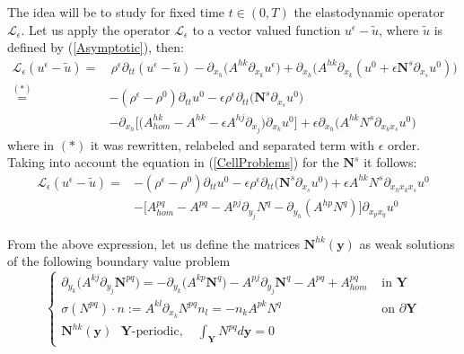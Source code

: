 The idea will be to study for fixed time $t \in (0,T)$ the elastodynamic operator $\mathcal{L}_{\epsilon}$.
Let us apply the operator $\mathcal{L}_{\epsilon}$ to a vector valued function $u^{\epsilon}-\tilde{u}$, where $\tilde{u}$ is defined by (\ref{Asymptotic}), then:
\begin{align*}
    \mathcal{L}_{\epsilon} (u^{\epsilon}-\tilde{u}) =&\, \rho^{\epsilon} \partial_{tt} (u^{\epsilon}-\tilde{u}) - \partial_{x_h} \big( A^{hk}\partial_{x_k} u^{\epsilon} \big) + \partial_{x_h} \big( A^{hk}\partial_{x_k} (u^0 + \epsilon \mathbf{N}^s \partial_{x_s}u^0 )\big) \\
    \overset{(*)}{=}& - (\rho^{\epsilon}-\rho^0) \partial_{tt} u^0 - \epsilon \rho^{\epsilon} \partial_{tt}\big(\mathbf{N}^s \partial_{x_s}u^0 \big)  \\
    & - \partial_{x_h} \big[ \big( A_{hom}^{hk} - A^{hk} - \epsilon A^{hj}\partial_{x_j}\big) \partial_{x_k} u^0 \big] + \epsilon \partial_{x_h} \big( A^{hk} N^s \partial_{x_k x_s} u^0 \big) 
\end{align*}
where in $(*)$ it was rewritten, relabeled and separated term with $\epsilon$ order.
Taking into account the equation in (\ref{CellProblems}) for the $\mathbf{N}^s$ it follows:
\begin{align*}
    \mathcal{L}_{\epsilon} (u^{\epsilon} - \tilde{u})  =& - (\rho^{\epsilon}-\rho^0) \partial_{tt} u^0 - \epsilon \rho^{\epsilon} \partial_{tt}\big(\mathbf{N}^s \partial_{x_s}u^0 \big) + \epsilon A^{hk}N^s \partial_{x_h x_k x_s}u^0 \\
    & - \big[ A^{pq}_{hom} - A^{pq} - A^{pj} \partial_{y_j} N^q - \partial_{y_h}(A^{hp} N^q) \big] \partial_{x_p x_q} u^0 
    \end{align*}

From the above expression, let us define the matrices $\mathbf{N}^{hk}(\mathbf{y})$ as weak solutions of the following boundary value problem
\begin{equation}
    \label{SecondCellProblem}
    \left \{
    \begin{array}{cc}
        \partial_{y_k} \big( A^{kj}\partial_{y_j} \mathbf{N}^{pq}\big) = -\partial_{y_k} \big( A^{kp} \mathbf{N}^q\big) - A^{pj}\partial_{y_j} \mathbf{N}^q - A^{pq} + A^{pq}_{hom} & \text{ in } \mathbf{Y}\\
        \sigma(N^{pq})\cdot n := A^{kl}\partial_{x_k}N^{pq}n_l = - n_k A^{pk}N^q & \text{ on } \partial \mathbf{Y} \\
        \mathbf{N}^{hk}(\mathbf{y}) \text{ $\mathbf{Y}$-periodic}, \quad  \int_{\mathbf{Y}} N^{pq} d \mathbf{y} = 0 &
    \end{array}
    \right .
\end{equation}

